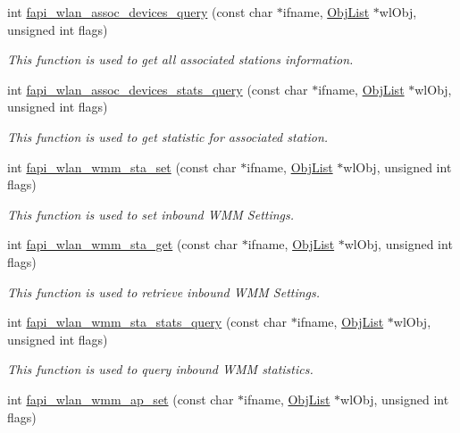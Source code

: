 \begin{DoxyCompactItemize}
int \hyperlink{group__FAPI__WLAN_ga3c9607a74d5a97b65b23bc6dd25957cc}{fapi\-\_\-wlan\-\_\-assoc\-\_\-devices\-\_\-query} (const char $\ast$ifname, \hyperlink{structObjList}{Obj\-List} $\ast$wl\-Obj, unsigned int flags)
\begin{DoxyCompactList}\small\item\em This function is used to get all associated stations information. \end{DoxyCompactList}\item 
int \hyperlink{group__FAPI__WLAN_gacb2e814f3c8f28731b578dec9fb8424d}{fapi\-\_\-wlan\-\_\-assoc\-\_\-devices\-\_\-stats\-\_\-query} (const char $\ast$ifname, \hyperlink{structObjList}{Obj\-List} $\ast$wl\-Obj, unsigned int flags)
\begin{DoxyCompactList}\small\item\em This function is used to get statistic for associated station. \end{DoxyCompactList}\item 
int \hyperlink{group__FAPI__WLAN_gaffc71927094b8d03aa95d9bdeb5bb63d}{fapi\-\_\-wlan\-\_\-wmm\-\_\-sta\-\_\-set} (const char $\ast$ifname, \hyperlink{structObjList}{Obj\-List} $\ast$wl\-Obj, unsigned int flags)
\begin{DoxyCompactList}\small\item\em This function is used to set inbound W\-M\-M Settings. \end{DoxyCompactList}\item 
int \hyperlink{group__FAPI__WLAN_ga337ef7e43df8d59e4607600c0daeb00b}{fapi\-\_\-wlan\-\_\-wmm\-\_\-sta\-\_\-get} (const char $\ast$ifname, \hyperlink{structObjList}{Obj\-List} $\ast$wl\-Obj, unsigned int flags)
\begin{DoxyCompactList}\small\item\em This function is used to retrieve inbound W\-M\-M Settings. \end{DoxyCompactList}\item 
int \hyperlink{group__FAPI__WLAN_gac70302d8dcc43f12fb4e25cf00b33ea6}{fapi\-\_\-wlan\-\_\-wmm\-\_\-sta\-\_\-stats\-\_\-query} (const char $\ast$ifname, \hyperlink{structObjList}{Obj\-List} $\ast$wl\-Obj, unsigned int flags)
\begin{DoxyCompactList}\small\item\em This function is used to query inbound W\-M\-M statistics. \end{DoxyCompactList}\item 
int \hyperlink{group__FAPI__WLAN_ga4240d27b6f011a7216113048b4cef513}{fapi\-\_\-wlan\-\_\-wmm\-\_\-ap\-\_\-set} (const char $\ast$ifname, \hyperlink{structObjList}{Obj\-List} $\ast$wl\-Obj, unsigned int flags)

\end{DoxyCompactItemize}

